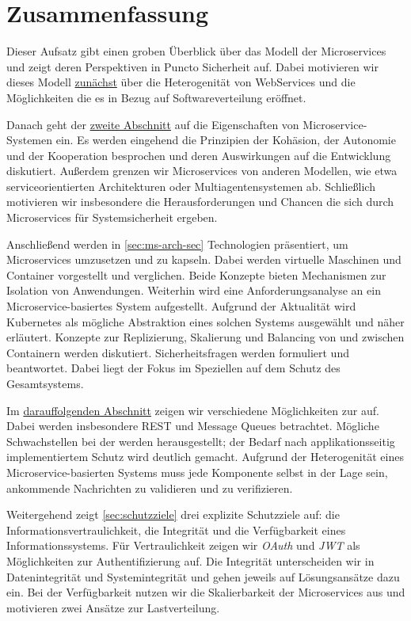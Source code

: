 \section{Zusammenfassung}
\label{sec:zsmfassung}

Dieser Aufsatz gibt einen groben Überblick über das Modell der Microservices und zeigt deren Perspektiven in Puncto Sicherheit auf. Dabei motivieren wir dieses Modell \hyperref[sec:einleitung]{zunächst} über die Heterogenität von WebServices und die Möglichkeiten die es in Bezug auf Softwareverteilung eröffnet.

Danach geht der \hyperref[sec:einführung]{zweite Abschnitt} auf die Eigenschaften von Microservice-Systemen ein. Es werden eingehend die Prinzipien der Kohäsion, der Autonomie und der Kooperation besprochen und deren Auswirkungen auf die Entwicklung diskutiert. Außerdem grenzen wir Microservices von anderen Modellen, wie etwa serviceorientierten Architekturen oder Multiagentensystemen ab. Schließlich motivieren wir insbesondere die Herausforderungen und Chancen die sich durch Microservices für Systemsicherheit ergeben.

Anschließend werden in \autoref{sec:ms-arch-sec} Technologien präsentiert, um Microservices umzusetzen und zu kapseln. Dabei werden virtuelle Maschinen und Container vorgestellt und verglichen. Beide Konzepte bieten Mechanismen zur Isolation von Anwendungen. Weiterhin wird eine Anforderungsanalyse an ein Microservice-basiertes System aufgestellt. Aufgrund der Aktualität wird Kubernetes als mögliche Abstraktion eines solchen Systems ausgewählt und näher erläutert. Konzepte zur Replizierung, Skalierung und Balancing von und zwischen Containern werden diskutiert. Sicherheitsfragen werden formuliert und beantwortet. Dabei liegt der Fokus im Speziellen auf dem Schutz des Gesamtsystems.

Im \hyperref[sec:kommunikation]{darauffolgenden Abschnitt} zeigen wir verschiedene Möglichkeiten zur \stscom auf. Dabei werden insbesondere REST und Message Queues betrachtet. Mögliche Schwachstellen bei der \stscom werden herausgestellt; der Bedarf nach applikationsseitig implementiertem Schutz wird deutlich gemacht. Aufgrund der Heterogenität eines Microservice-basierten Systems muss jede Komponente selbst in der Lage sein, ankommende Nachrichten zu validieren und zu verifizieren.

Weitergehend zeigt \autoref{sec:schutzziele} drei explizite Schutzziele auf: die Informationsvertraulichkeit, die Integrität und die Verfügbarkeit eines Informationssystems. Für Vertraulichkeit zeigen wir \textit{OAuth} und \textit{JWT} als Möglichkeiten zur Authentifizierung auf. Die Integrität unterscheiden wir in Datenintegrität und Systemintegrität und gehen jeweils auf Lösungsansätze dazu ein. Bei der Verfügbarkeit nutzen wir die Skalierbarkeit der Microservices aus und motivieren zwei Ansätze zur Lastverteilung.